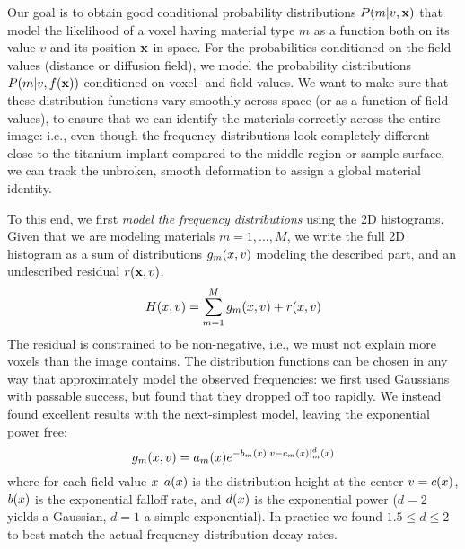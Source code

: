 Our goal is to obtain good conditional probability distributions $P(m|v,\mathbf{x})$
that model the likelihood of a voxel having material type $m$ as a function
both on its value $v$ and its position $\mathbf{x}$ in space. For the probabilities
conditioned on the field values (distance or diffusion field), we model
the probability distributions $P(m|v,f(\mathbf{x}))$ conditioned on
voxel- and field values. We want to make sure that these distribution
functions vary smoothly across space (or as a function of field values),
to ensure that we can identify the materials correctly across the entire
image: i.e., even though the frequency distributions look completely different
close to the titanium implant compared to the middle region or sample surface,
we can track the unbroken, smooth deformation to assign a global material
identity.

To this end, we first {\em model the frequency distributions} using the
2D histograms. Given that we are modeling materials $m=1,\ldots,M$,
we write the full 2D histogram as a sum of distributions
$g_m(x,v)$ modeling the described part, and an undescribed
residual $r(\mathbf{x},v)$.
\begin{equation}
  \label{eq:hist}
  H(x,v) = \sum_{m=1}^M g_m(x,v) + r(x,v)
\end{equation}
The residual is constrained to be non-negative, i.e., we must not explain
more voxels than the image contains.
The distribution functions can be chosen in any way that approximately
model the observed frequencies: we first used Gaussians with passable success,
but found that they dropped off too rapidly. We instead found excellent results
with the next-simplest model, leaving the exponential power free:
\begin{equation}
  \label{eq:dist-form}
  g_m(x,v) = a_m(x) e^{-b_m(x) |v-c_m(x)|^d_m(x)}
\end{equation}
where for each field value $x$
$a(x)$ is the distribution height at the center $v=c(x)$,
$b(x)$ is the exponential falloff rate, and $d(x)$ is
the exponential power ($d=2$ yields a Gaussian, $d=1$ a simple exponential).
In practice we found $1.5\le d \le 2$ to best match the actual frequency
distribution decay rates.

